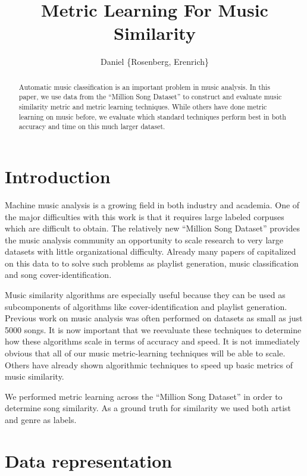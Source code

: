 \documentclass[a4paper,10pt]{article}
\title{Metric Learning For Music Similarity}
\author{Daniel \{Rosenberg, Erenrich\} }
\begin{document}
\maketitle

\begin{abstract}
Automatic music classification is an important problem in music analysis. In this paper, we use data from the ``Million Song Dataset'' to construct and evaluate music similarity metric and metric learning techniques. While others have done metric learning on music before, we evaluate which standard techniques perform best in both accuracy and time on this much larger dataset.
\end{abstract}

\section{Introduction}
Machine music analysis is a growing field in both industry and academia. One of the major difficulties with this work is that it requires large labeled corpuses which are difficult to obtain. The relatively new ``Million Song Dataset'' provides the music analysis community an opportunity to scale research to very large datasets with little organizational difficulty\cite{Bertin-Mahieux2011}. Already many papers of capitalized on this data to to solve such problems as playlist generation\cite{mcfee2011_nlp}, music classification and song cover-identification\cite{Bertin-Mahieux2011b}. 

Music similarity algorithms are especially useful because they can be used as subcomponents of algorithms like cover-identification and playlist generation. Previous work on music analysis was often performed on datasets as small as just 5000 songs\cite{Slaney_learninga}. It is now important that we reevaluate these techniques to determine how these algorithms scale in terms of accuracy and speed. It is not immediately obvious that all of our music metric-learning techniques will be able to scale. Others have already shown algorithmic techniques to speed up basic metrics of music similarity\cite{mcfee2011_sim}.

We performed metric learning across the ``Million Song Dataset'' in order to determine song similarity. As a ground truth for similarity we used both artist and genre as labels.
\section{Data representation}
\end{document}
